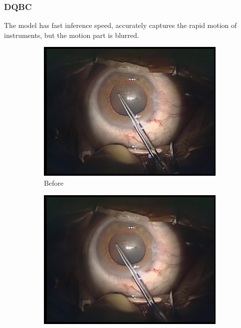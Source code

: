 \documentclass[lettersize,journal]{IEEEtran}
\begin{document}
\subsubsection{DQBC}
The model has fast inference speed, accurately captures the rapid motion of instruments, but the motion part is blurred.
\begin{figure}[h!]
    \centering
    \begin{subfigure}[b]{0.3\textwidth}
        \includegraphics[width=\textwidth]{Image/DQBC result1.jpg}
        \caption{Before}
        \label{fig:dqbc1}
    \end{subfigure}
    \hfill
    \begin{subfigure}[b]{0.3\textwidth}
        \includegraphics[width=\textwidth]{Image/DQBC result2.jpg}

\end{subfigure}
\end{figure}
\end{document}
